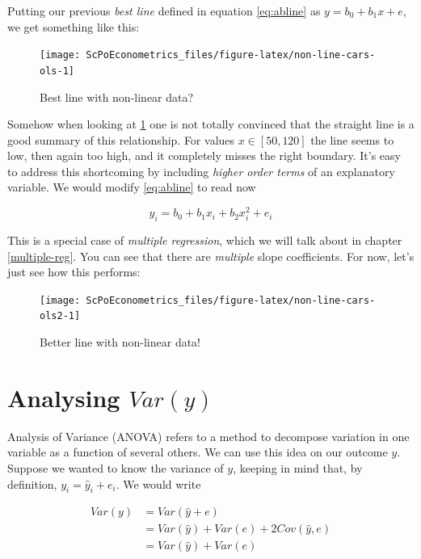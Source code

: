 \documentclass[]{book}
\begin{document}
Putting our previous \emph{best line} defined in equation
\eqref{eq:abline} as \(y = b_0 + b_1 x + e\), we get something like this:

\begin{figure}

{\centering \texttt{[image: ScPoEconometrics\_files/figure-latex/non-line-cars-ols-1]} 

}

\caption{Best line with non-linear data?}\label{fig:non-line-cars-ols}
\end{figure}

Somehow when looking at \ref{fig:non-line-cars-ols} one is not totally
convinced that the straight line is a good summary of this relationship.
For values \(x\in[50,120]\) the line seems to low, then again too high,
and it completely misses the right boundary. It's easy to address this
shortcoming by including \emph{higher order terms} of an explanatory
variable. We would modify \eqref{eq:abline} to read now

\begin{equation}
y_i = b_0 + b_1 x_i + b_2 x_i^2 + e_i \label{eq:abline2}
\end{equation}

This is a special case of \emph{multiple regression}, which we will talk
about in chapter \ref{multiple-reg}. You can see that there are
\emph{multiple} slope coefficients. For now, let's just see how this
performs:

\begin{figure}

{\centering \texttt{[image: ScPoEconometrics\_files/figure-latex/non-line-cars-ols2-1]} 

}

\caption{Better line with non-linear data!}\label{fig:non-line-cars-ols2}
\end{figure}

\section{\texorpdfstring{Analysing
\(Var(y)\)}{Analysing Var(y)}}\label{analysing-vary}

Analysis of Variance (ANOVA) refers to a method to decompose variation
in one variable as a function of several others. We can use this idea on
our outcome \(y\). Suppose we wanted to know the variance of \(y\),
keeping in mind that, by definition, \(y_i = \hat{y}_i + e_i\). We would
write

\begin{align}
Var(y) &= Var(\hat{y} + e)\\
 &= Var(\hat{y}) + Var(e) + 2 Cov(\hat{y},e)\\
 &= Var(\hat{y}) + Var(e) \label{eq:anova}
\end{align}
\end{document}

